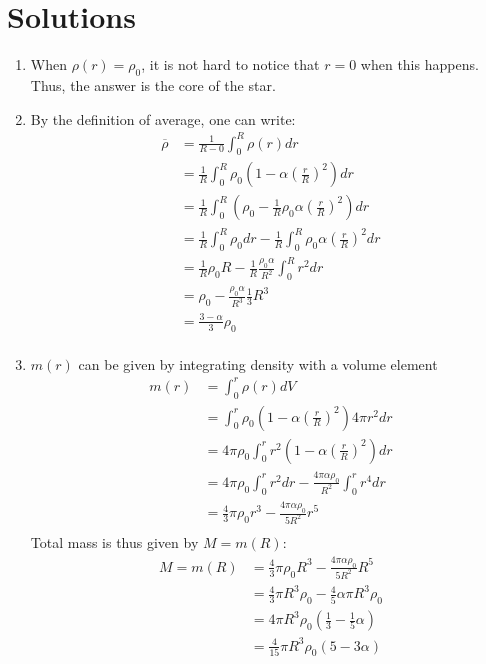 \documentclass{article}
\begin{document}
\section{Solutions}
\begin{enumerate}
    \item When $\rho(r) = \rho_0$, it is not hard to notice that $r = 0$ when this happens.
    Thus, the answer is the core of the star.

    \item By the definition of average, one can write:
    \begin{align*}
        \overline{\rho} &= \frac{1}{R-0} \int_{0}^{R} \rho(r) dr\\
        &= \frac{1}{R} \int_{0}^{R} \rho_0\left(1-\alpha\left(\frac{r}{R}\right)^2\right) dr\\
        &= \frac{1}{R} \int_{0}^{R} \left(\rho_0- \frac{1}{R} \rho_0\alpha\left(\frac{r}{R}\right)^2\right) dr\\
        &= \frac{1}{R} \int_{0}^{R}\rho_0 dr - \frac{1}{R} \int_{0}^{R}\rho_0 \alpha \left(\frac{r}{R}\right)^2 dr\\
        &= \frac{1}{R} \rho_0 R - \frac{1}{R} \frac{\rho_0 \alpha}{R^2} \int_{0}^{R} r^2 dr\\
        &= \rho_0 - \frac{\rho_0 \alpha}{R^3} \frac{1}{3}R^3\\
        &= \frac{3 - \alpha}{3}\rho_0\\
    \end{align*}

    \item $m(r)$ can be given by integrating density with a volume element
    \begin{align*}
        m(r) &= \int_{0}^{r}\rho(r) dV\\
        &= \int_{0}^{r} \rho_0\left(1-\alpha\left(\frac{r}{R}\right)^2\right) 4\pi r^2 dr\\
        &= 4\pi \rho_0 \int_{0}^{r}r^2\left(1-\alpha\left(\frac{r}{R}\right)^2\right) dr\\
        &= 4\pi \rho_0 \int_{0}^{r}r^2 dr - \frac{4\pi \alpha \rho_0}{R^2} \int_{0}^{r}r^4 dr\\
        &=\frac{4}{3}\pi\rho_0 r^3 - \frac{4\pi\alpha\rho_0}{5R^2}r^5\\
    \end{align*}
    Total mass is thus given by $M = m(R)$:
    \begin{align*}
        M = m(R) &= \frac{4}{3}\pi\rho_0 R^3 - \frac{4\pi\alpha\rho_0}{5R^2}R^5\\
        &= \frac{4}{3}\pi R^3\rho_0 - \frac{4}{5}\alpha\pi R^3\rho_0\\
        &= 4\pi R^3\rho_0(\frac{1}{3}- \frac{1}{5}\alpha)\\
        &= \frac{4}{15}\pi R^3\rho_0 (5-3\alpha)\\
    \end{align*}


\end{enumerate}
\end{document}
